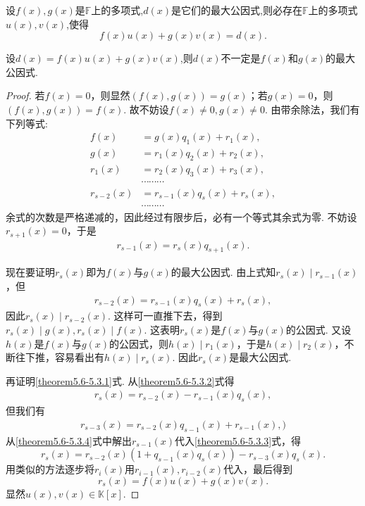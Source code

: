 \documentclass[lang=cn,newtx,10pt,scheme=chinese]{elegantbook}
\begin{document}
\begin{theorem}[最大公因式的必要条件]\label{theorem:最大公因式的必要条件}
设\(f(x),g(x)\)是\(\mathbb{F}\)上的多项式,\(d(x)\)是它们的最大公因式,则必存在\(\mathbb{F}\)上的多项式\(u(x),v(x)\),使得\[f(x)u(x)+g(x)v(x)=d(x).\]
\end{theorem}
\begin{remark}
设\(d(x)=f(x)u(x)+g(x)v(x)\),则\(d(x)\)不一定是\(f(x)\)和\(g(x)\)的最大公因式.
\end{remark}
\begin{proof}
若\(f(x)=0\)，则显然\((f(x),g(x)) = g(x)\)；若\(g(x)=0\)，则\((f(x),g(x)) = f(x)\). 故不妨设\(f(x)\neq 0,g(x)\neq 0\). 由带余除法，我们有下列等式:
\begin{align*}
f(x)&=g(x)q_1(x)+r_1(x),\\
g(x)&=r_1(x)q_2(x)+r_2(x),\\
r_1(x)&=r_2(x)q_3(x)+r_3(x),\\
&\cdots\cdots\cdots\\
r_{s - 2}(x)&=r_{s - 1}(x)q_s(x)+r_s(x),\\
&\cdots\cdots\cdots
\end{align*}
余式的次数是严格递减的，因此经过有限步后，必有一个等式其余式为零. 不妨设\(r_{s + 1}(x)=0\)，于是
\begin{align}
r_{s - 1}(x)=r_s(x)q_{s + 1}(x). \label{theorem5.6-5.3.1}
\end{align}

现在要证明\(r_s(x)\)即为\(f(x)\)与\(g(x)\)的最大公因式. 由上式知\(r_s(x)\mid r_{s - 1}(x)\)，但
\begin{align}
r_{s - 2}(x)=r_{s - 1}(x)q_s(x)+r_s(x),\label{theorem5.6-5.3.2}   
\end{align}
因此\(r_s(x)\mid r_{s - 2}(x)\). 这样可一直推下去，得到\(r_s(x)\mid g(x),r_s(x)\mid f(x)\). 这表明\(r_s(x)\)是\(f(x)\)与\(g(x)\)的公因式. 又设\(h(x)\)是\(f(x)\)与\(g(x)\)的公因式，则\(h(x)\mid r_1(x)\)，于是\(h(x)\mid r_2(x)\)，不断往下推，容易看出有\(h(x)\mid r_s(x)\). 因此\(r_s(x)\)是最大公因式.

再证明\eqref{theorem5.6-5.3.1}式. 从\eqref{theorem5.6-5.3.2}式得
\begin{align}
r_s(x)=r_{s - 2}(x)-r_{s - 1}(x)q_s(x),\label{theorem5.6-5.3.3}    
\end{align}
但我们有
\begin{align}
r_{s - 3}(x)=r_{s - 2}(x)q_{s - 1}(x)+r_{s - 1}(x),\label{theorem5.6-5.3.4})    
\end{align}
从\eqref{theorem5.6-5.3.4}式中解出\(r_{s - 1}(x)\)代入\eqref{theorem5.6-5.3.3}式，得
\[
r_s(x)=r_{s - 2}(x)(1 + q_{s - 1}(x)q_s(x))-r_{s - 3}(x)q_s(x).
\]
用类似的方法逐步将\(r_i(x)\)用\(r_{i - 1}(x),r_{i - 2}(x)\)代入，最后得到
\[
r_s(x)=f(x)u(x)+g(x)v(x).
\]
显然\(u(x),v(x)\in\mathbb{K}[x]\).
\end{proof}
\end{document}
